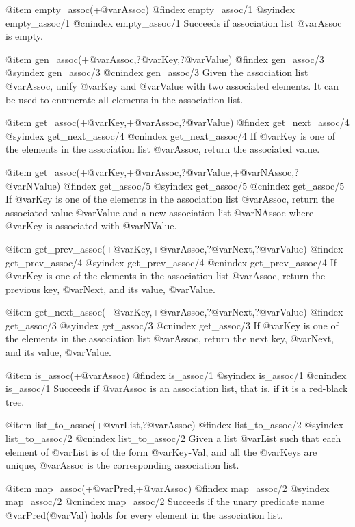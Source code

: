 {{{{{{{{@item empty_assoc(+@var{Assoc})
@findex empty_assoc/1
@syindex empty_assoc/1
@cnindex empty_assoc/1
Succeeds if association list @var{Assoc} is empty.

@item gen_assoc(+@var{Assoc},?@var{Key},?@var{Value})
@findex gen_assoc/3
@syindex gen_assoc/3
@cnindex gen_assoc/3
Given the association list @var{Assoc}, unify @var{Key} and @var{Value}
with two associated elements. It can be used to enumerate all elements
in the association list.

@item get_assoc(+@var{Key},+@var{Assoc},?@var{Value})
@findex get_next_assoc/4
@syindex get_next_assoc/4
@cnindex get_next_assoc/4
If @var{Key} is one of the elements in the association list @var{Assoc},
return the associated value.

@item get_assoc(+@var{Key},+@var{Assoc},?@var{Value},+@var{NAssoc},?@var{NValue})
@findex get_assoc/5
@syindex get_assoc/5
@cnindex get_assoc/5
If @var{Key} is one of the elements in the association list @var{Assoc},
return the associated value @var{Value} and a new association list
@var{NAssoc} where @var{Key} is associated with @var{NValue}.

@item get_prev_assoc(+@var{Key},+@var{Assoc},?@var{Next},?@var{Value})
@findex get_prev_assoc/4
@syindex get_prev_assoc/4
@cnindex get_prev_assoc/4
If @var{Key} is one of the elements in the association list @var{Assoc},
return the previous key, @var{Next}, and its value, @var{Value}.

@item get_next_assoc(+@var{Key},+@var{Assoc},?@var{Next},?@var{Value})
@findex get_assoc/3
@syindex get_assoc/3
@cnindex get_assoc/3
If @var{Key} is one of the elements in the association list @var{Assoc},
return the next key, @var{Next}, and its value, @var{Value}.

@item is_assoc(+@var{Assoc})
@findex is_assoc/1
@syindex is_assoc/1
@cnindex is_assoc/1
Succeeds if @var{Assoc} is an association list, that is, if it is a
red-black tree.

@item list_to_assoc(+@var{List},?@var{Assoc})
@findex list_to_assoc/2
@syindex list_to_assoc/2
@cnindex list_to_assoc/2
Given a list @var{List} such that each element of @var{List} is of the
form @var{Key-Val}, and all the @var{Keys} are unique, @var{Assoc} is
the corresponding association list.

@item map_assoc(+@var{Pred},+@var{Assoc})
@findex map_assoc/2
@syindex map_assoc/2
@cnindex map_assoc/2
Succeeds if the unary predicate name @var{Pred}(@var{Val}) holds for every
element in the association list.

}}}}}}}}
